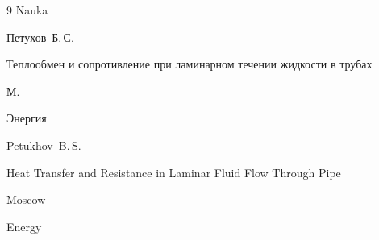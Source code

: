 \begin{thebibliography}{9}
\publ Nauka








\by Петухов~Б.\,С.

\book Теплообмен и сопротивление при ламинарном течении жидкости в трубах

\publaddr М.

\publ Энергия



\misctransl

\by Petukhov~B.\,S.


\book Heat Transfer and Resistance in Laminar Fluid Flow Through Pipe

\publaddr Moscow

\publ Energy




\end{thebibliography}



\noindent

\hskip6.5cm \thedate \par\noindent

\hskip6.5cm\therevdate





\makeengtitle



\newpage



%

